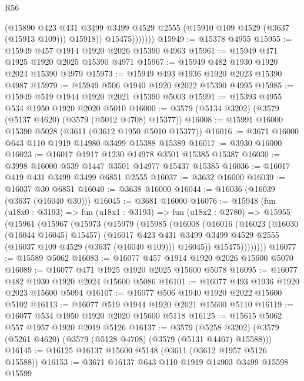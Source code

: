 \begin{lexlean}{R56}
\begin{coremodule}
                    (@15890
                      @423
                      @431
                      @3499
                      @3499
                      @4529
                      @2555
                      (@15910 @109 @4529 (@3637 (@15913 @109)))
                      @15918))
                  @15475)))))))
@15949 := @15378 @4955
@15955 := @15949 @457 @1914 @1920 @2026 @15390 @4963
@15961 := @15949 @471 @1925 @1920 @2025 @15390 @4971
@15967 := @15949 @482 @1930 @1920 @2024 @15390 @4979
@15973 := @15949 @493 @1936 @1920 @2023 @15390 @4987
@15979 := @15949 @506 @1940 @1920 @2022 @15390 @4995
@15985 := @15949 @519 @1944 @1920 @2021 @15390 @5003
@15991 := @15393 @4955 @534 @1950 @1920 @2020 @5010
@16000 := @3579 (@5134 @3202) (@3579 (@5137 @4620) (@3579 (@5012 @4708) @15377))
@16008 := @15991 @16000 @15390 @5028 (@3611 (@3612 @1950 @5010 @15377))
@16016 := @3671 @16000 @643 @110 @1919 @14980 @3499 @15388 @15389
@16017 := @3930 @16000
@16023 := @16017 @1917 @1230 @14978 @3501 @15385 @15387
@16030 := @3998 @16000 @539 @1447 @3501 @14977 @15437 @15385
@16036 := @16017 @419 @431 @3499 @3499 @6851 @2555
@16037 := @3632 @16000
@16039 := @16037 @30 @6851
@16040 := @3638 @16000
@16044 := @16036 (@16039 (@3637 (@16040 @30)))
@16045 := @3681 @16000
@16076 := @15948
    (fun (u18x0 : @3193) =>
    fun (u18x1 : @3193) =>
    fun (u18x2 : @2780) =>
    @15955
      (@15961
        (@15967
          (@15973
            (@15979
              (@15985
                (@16008
                  (@16016
                    (@16023
                      (@16030 (@16044 @16045) @15457)
                      (@16017
                        @423
                        @431
                        @3499
                        @3499
                        @4529
                        @2555
                        (@16037 @109 @4529 (@3637 (@16040 @109)))
                        @16045))
                    @15475))))))))
@16077 := @15589 @5062
@16083 := @16077 @457 @1914 @1920 @2026 @15600 @5070
@16089 := @16077 @471 @1925 @1920 @2025 @15600 @5078
@16095 := @16077 @482 @1930 @1920 @2024 @15600 @5086
@16101 := @16077 @493 @1936 @1920 @2023 @15600 @5094
@16107 := @16077 @506 @1940 @1920 @2022 @15600 @5102
@16113 := @16077 @519 @1944 @1920 @2021 @15600 @5110
@16119 := @16077 @534 @1950 @1920 @2020 @15600 @5118
@16125 := @15615 @5062 @557 @1957 @1920 @2019 @5126
@16137 := @3579
    (@5258 @3202)
    (@3579 (@5261 @4620) (@3579 (@5128 @4708) (@3579 (@5131 @4467) @15588)))
@16145 := @16125 @16137 @15600 @5148 (@3611 (@3612 @1957 @5126 @15588))
@16153 := @3671 @16137 @643 @110 @1919 @14903 @3499 @15598 @15599

\end{coremodule}
\end{lexlean}
